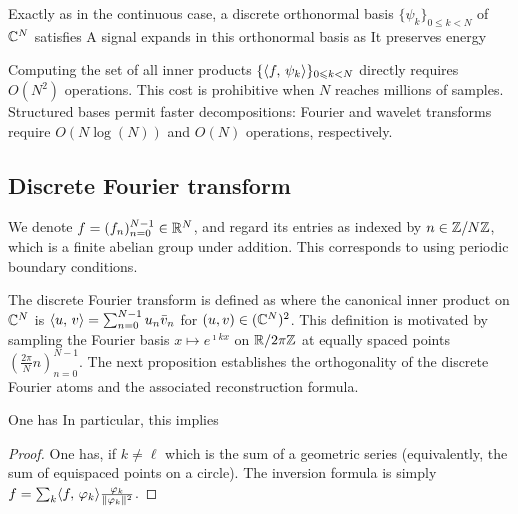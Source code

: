 Exactly as in the continuous case, a discrete orthonormal basis $\{ \psi_k \}_{0 \leq k < N }$ of $\mathbb{C}^N$ satisfies
A signal expands in this orthonormal basis as
It preserves energy

Computing the set of all inner products $\{\langle f,\,\psi_k\rangle\}_{0 \leqslant k < N}$ directly requires $O(N^2)$ operations.
This cost is prohibitive when $N$ reaches millions of samples. Structured bases permit faster decompositions: Fourier and wavelet transforms require $O(N\log(N))$ and $O(N)$ operations, respectively.


\subsection{Discrete Fourier transform}

We denote $f = (f_n)_{n=0}^{N-1} \in \mathbb{R}^N$, and regard its entries as indexed by $n \in \mathbb{Z}/N\mathbb{Z}$, which is a finite abelian group under addition. This corresponds to using periodic boundary conditions.

The discrete Fourier transform is defined as
where the canonical inner product on $\mathbb{C}^N$ is $\langle u,\,v\rangle=\sum_{n=0}^{N-1}u_n\bar v_n$ for $(u,v) \in (\mathbb{C}^N)^2$.
%
This definition is motivated by sampling the Fourier basis $x \mapsto e^{\imath k x}$ on $\mathbb{R}/2\pi\mathbb{Z}$ at equally spaced points $( \frac{2\pi}{N}n )_{n=0}^{N-1}$.
%
The next proposition establishes the orthogonality of the discrete Fourier atoms and the associated reconstruction formula.

\begin{prop}
	One has
	In particular, this implies
\end{prop}
\begin{proof}
	One has, if $k \neq \ell$
	which is the sum of a geometric series (equivalently, the sum of equispaced points on a circle). 
	The inversion formula is simply $f = \sum_k \langle f,\,\varphi_k\rangle \frac{\varphi_k}{\lVert\varphi_k\rVert^2}$.
\end{proof}



